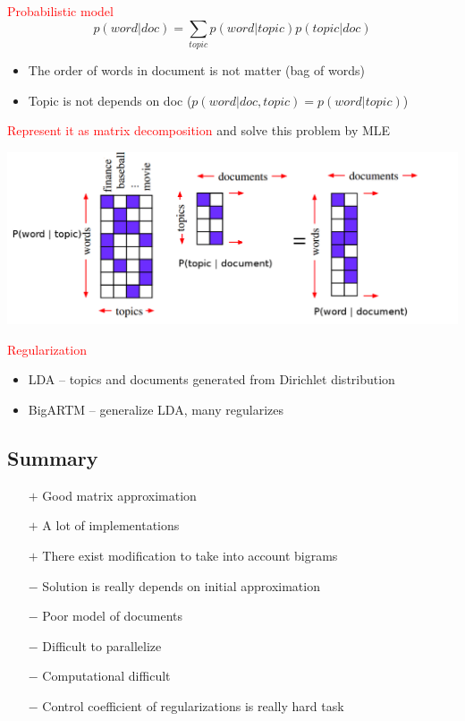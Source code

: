\documentclass{beamer}
\begin{document}
\begin{frame}
		\textcolor{red}{Probabilistic model}
		$$p(word | doc) = \sum_{topic} p(word | topic) p(topic|doc)$$
		
		\vspace{-0.3cm}
		\begin{itemize}
			\item The order of words in document is not matter (bag of words)
			\item Topic is not depends on doc ($p(word|doc, topic) = p(word| topic)$)
		\end{itemize}
		
		\vspace{-0.05cm}
		\textcolor{red}{Represent it as matrix decomposition} and solve this problem by MLE
		\begin{center}
			\includegraphics[scale=0.25]{img/mat_dec}
		\end{center} 
		
		\vspace{-0.5cm}
		\textcolor{red}{Regularization}
		\begin{itemize}
			\item LDA --  topics and documents generated from Dirichlet distribution
			\item BigARTM --  generalize LDA, many regularizes
		\end{itemize}
		
\end{frame}

\subsection*{Summary}
\begin{frame}
	\begin{itemize}
		\item[$+$] Good matrix approximation
		\item[$+$] A lot of implementations
		\item[$+$] There exist modification to take into account bigrams 
		\item[$-$] Solution is really depends on initial approximation
		\item[$-$] Poor model of documents
		\item[$-$] Difficult to parallelize
		\item[$-$] Computational difficult 
		\item[$-$] Control coefficient of regularizations is really hard task
	\end{itemize}
\end{frame}
\end{document}
